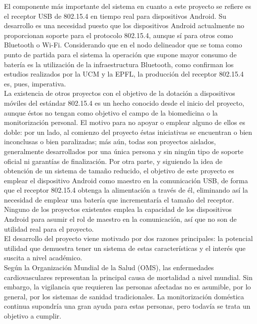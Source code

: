 	El componente más importante del sistema en cuanto a este proyecto se refiere es el receptor USB de 802.15.4 en tiempo real para dispositivos Android. Su desarrollo es una necesidad puesto que los dispositivos Android actualmente no proporcionan soporte para el protocolo 802.15.4, aunque sí para otros como Bluetooth o Wi-Fi. Considerando que en el nodo delineador que se toma como punto de partida para el sistema la operación que supone mayor consumo de batería es la utilización de la infraestructura Bluetooth, como confirman los estudios realizados por la UCM y la EPFL, la producción del receptor 802.15.4 es, pues, imperativa.\\

	La existencia de otros proyectos con el objetivo de la dotación a dispositivos móviles del estándar 802.15.4 es un hecho conocido desde el inicio del proyecto, aunque éstos no tengan como objetivo el campo de la biomedicina o la monitorización personal. El motivo para no apoyar o emplear alguno de ellos es doble: por un lado, al comienzo del proyecto éstas iniciativas se encuentran o bien inconclusas o bien paralizadas; más aún, todas son proyectos aislados, generalmente desarrollados por una única persona y sin ningún tipo de soporte oficial ni garantías de finalización. Por otra parte, y siguiendo la idea de obtención de un sistema de tamaño reducido, el objetivo de este proyecto es emplear el dispositivo Android como maestro en la comunicación USB, de forma que el receptor 802.15.4 obtenga la alimentación a través de él, eliminando así la necesidad de emplear una batería que incrementaría el tamaño del receptor. Ninguno de los proyectos existentes emplea la capacidad de los dispositivos Android para asumir el rol de maestro en la comunicación, así que no son de utilidad real para el proyecto.\\

	El desarrollo del proyecto viene motivado por dos razones principales: la 
	potencial utilidad que demuestra tener un sistema de estas características 
	y el interés que suscita a nivel académico.\\

	Según la Organización Mundial de la Salud (OMS), las enfermedades cardiovasculares representan la
	principal causa de mortalidad a nivel mundial. Sin embargo, la vigilancia que requieren las
	personas afectadas no es asumible, por lo general, por los sistemas de sanidad tradicionales. La
	monitorización doméstica continua supondría una gran ayuda para estas personas, pero todavía
	se trata un objetivo a cumplir.\\

